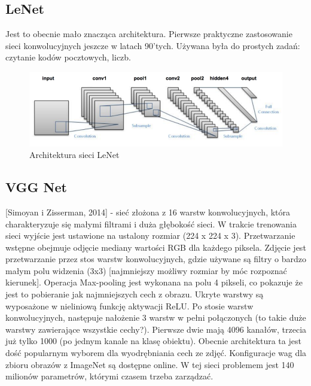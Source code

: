 \documentclass[a4paper,twoside,titlepage,openright]{book}
\begin{document}
\subsection{LeNet}
Jest to obecnie mało znacząca architektura. Pierwsze praktyczne zastosowanie sieci konwolucyjnych jeszcze w latach 90’tych. Używana była do prostych zadań: czytanie kodów pocztowych, liczb.

\begin{figure}[h]
	\centering
			\includegraphics[resolution=120]{LeNet.png}
		\caption{Architektura sieci LeNet}
\end{figure}

\subsection{VGG Net}
 [Simoyan i Zisserman, 2014] - sieć złożona z 16 warstw konwolucyjnych, która charakteryzuje się małymi filtrami i duża głębokość sieci.
W trakcie trenowania sieci wyjście jest ustawione na ustalony rozmiar (224 x 224 x 3). Przetwarzanie wstępne obejmuje odjęcie mediany wartości RGB dla każdego piksela. Zdjęcie jest przetwarzanie przez stos warstw konwolucyjnych, gdzie używane są filtry o bardzo małym polu widzenia (3x3) [najmniejszy możliwy rozmiar by móc rozpoznać kierunek]. Operacja Max-pooling jest wykonana na polu 4 pikseli, co pokazuje że jest to pobieranie jak najmniejszych cech z obrazu. Ukryte warstwy są wyposażone w nieliniową funkcję aktywacji ReLU. Po stosie warstw konwolucyjnych, następuje nałożenie 3 warstw w pełni połączonych (to takie duże warstwy zawierające wszystkie cechy?). Pierwsze dwie mają 4096 kanałów, trzecia już tylko 1000 (po jednym kanale na klasę obiektu). Obecnie architektura ta jest dość popularnym wyborem dla wyodrębniania cech ze zdjęć. Konfiguracje wag dla zbioru obrazów z ImageNet są dostępne online. W tej sieci problemem jest 140 milionów parametrów, którymi czasem trzeba zarządzać.
\end{document}
